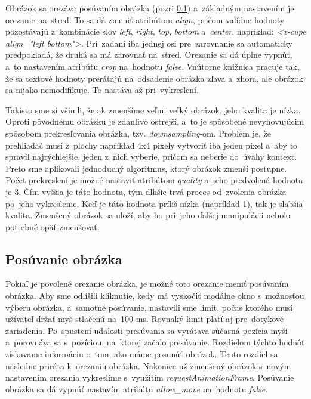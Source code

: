 Obrázok sa orezáva posúvaním obrázka (pozri \ref{sec:posuvanie-obrazka}) a~základným nastavením je orezanie na~stred. To sa dá zmeniť atribútom \emph{align}, pričom valídne hodnoty pozostávajú z~kombinácie slov \emph{left}, \emph{right}, \emph{top}, \emph{bottom} a~\emph{center}, napríklad: \emph{<x-cupe align="left bottom"\textgreater}. Pri~zadaní iba jednej osi pre~zarovnanie sa automaticky predpokladá, že druhá sa má zarovnať na~stred. Orezanie sa dá úplne vypnúť, a~to nastavením atribútu \emph{crop} na~hodnotu \emph{false}. Vnútorne knižnica pracuje tak, že sa textové hodnoty prerátajú na~odsadenie obrázka zľava a~zhora, ale obrázok sa nijako nemodifikuje. To nastáva až pri~vykreslení.

Takisto sme si všimli, že ak zmenšíme veľmi veľký obrázok, jeho kvalita je nízka. Oproti pôvodnému obrázku je zdanlivo ostrejší, a~to je spôsobené nevyhovujúcim spôsobom prekresľovania obrázka, tzv. \emph{downsampling}-om. Problém je, že prehliadač musí z~plochy napríklad 4x4 pixely vytvoriť iba jeden pixel a~aby to spravil najrýchlejšie, jeden z~nich vyberie, pričom sa neberie do~úvahy kontext. Preto sme aplikovali jednoduchý algoritmus, ktorý obrázok zmenší postupne. Počet prekreslení je možné nastaviť atribútom \emph{quality} a~jeho predvolená hodnota je 3. Čím vyššia je táto hodnota, tým dlhšie trvá proces od~zvolenia obrázka po~jeho vykreslenie. Keď je táto hodnota príliš nízka (napríklad 1), tak je slabšia kvalita. Zmenšený obrázok sa uloží, aby ho pri~jeho ďalšej manipulácii nebolo potrebné opäť zmenšovať.

\subsection{Posúvanie obrázka}
\label{sec:posuvanie-obrazka}

Pokiaľ je povolené orezanie obrázka, je možné toto orezanie meniť posúvaním obrázka. Aby sme odlíšili kliknutie, kedy má vyskočiť modálne okno s~možnosťou výberu obrázka, a~samotné posúvanie, nastavili sme limit, počas ktorého musí užívateľ držať myš stlačenú na~100 ms. Rovnaký limit platí aj pre~dotykové zariadenia. Po~spustení udalosti presúvania sa vyrátava súčasná pozícia myši a~porovnáva sa s~pozíciou, na~ktorej začalo presúvanie. Rozdielom týchto hodnôt získavame informáciu o~tom, ako máme posunúť obrázok. Tento rozdiel sa následne priráta k~orezaniu obrázka. Nakoniec už zmenšený obrázok s~novým nastavením orezania vykreslíme s~využitím \emph{requestAnimationFrame}. Posúvanie obrázka sa dá vypnúť nastavím atribútu \emph{allow\_move} na~hodnotu \emph{false}.

